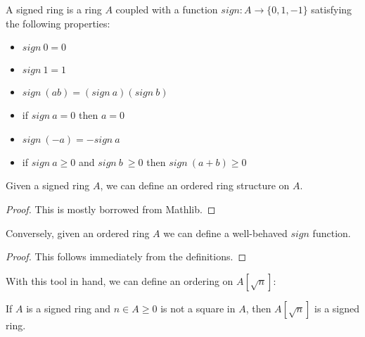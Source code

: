 \begin{definition}
  \label{def:signedRing}
  \leanok
  A signed ring is a ring $A$ coupled with a function $sign : A → \{0, 1, -1\}$
  satisfying the following properties: \begin{itemize}
    \item $sign~0 = 0$
    \item $sign~1 = 1$
    \item $sign~(ab) = (sign~a)(sign~b)$
    \item if $sign~a = 0$ then $a = 0$
    \item $sign~(-a) = -sign~a$
    \item if $sign~a \geq 0$ and $sign~b~\geq 0$ then $sign~(a + b) \geq 0$
  \end{itemize}
\end{definition}

\begin{lemma}
  \label{thm:orderFromSign}
  \leanok
  Given a signed ring $A$, we can define an ordered ring structure on $A$.
\end{lemma}
\begin{proof}
  \leanok
  This is mostly borrowed from Mathlib.
\end{proof}
\begin{lemma}
  \label{thm:signFromOrder}
  \leanok
  Conversely, given an ordered ring $A$ we can define a well-behaved $sign$
  function.
\end{lemma}
\begin{proof}
  \leanok
  This follows immediately from the definitions.
\end{proof}


With this tool in hand, we can define an ordering on $A[\sqrt{n}]$:

\begin{definition}
  \label{def:adjoinSign}
  \leanok
  If $A$ is a signed ring and $n ∈ A \geq 0$ is not a square in $A$, then
  $A[\sqrt{n}]$ is a signed ring.
\end{definition}

